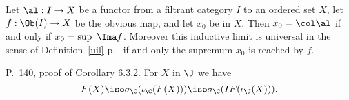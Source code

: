 \documentclass[12pt]{article}
\theoremstyle{remark}
\theoremstyle{definition}
\begin{document}
\begin{cor}
Let $\al:I\to X$ be a functor from a filtrant category $I$ to an ordered set $X$, let $f:\Ob(I)\to X$ be the obvious map, and let $x_0$ be in $X$. Then $x_0=\col\al$ if and only if $x_0=\sup\ \Ima f$. Moreover this inductive limit is universal in the sense of Definition~\ref{uil} p.~ if and only the supremum $x_0$ is reached by $f$.
\end{cor} 



\begin{s} 
P.~140, proof of Corollary 6.3.2. For $X$ in $\J$ we have 
$$
F(X)\iso\sigma_\C(\iota_\C(F(X)))\iso\sigma_\C(IF(\iota_\J(X))).
$$
\end{s}

%
\end{document}
